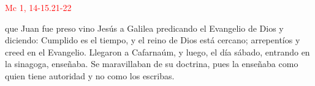 \hfill\textcolor{red}{Mc 1, 14-15.21-22}

que Juan fue preso vino Jesús a Galilea predicando el Evangelio de Dios y diciendo: Cumplido es el tiempo, y el reino de Dios está cercano;
arrepentíos y creed en el Evangelio. Llegaron a Cafarnaúm, y luego, el día sábado, entrando en la sinagoga, enseñaba. Se maravillaban de su doctrina,
pues la enseñaba como quien tiene autoridad y no como los escribas.